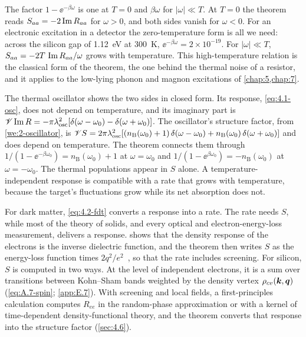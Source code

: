 The factor $1 - \ee^{-\beta\omega}$ is one at $T = 0$ and $\beta\omega$ for $|\omega| \ll T$. At $T = 0$ the theorem reads $S_{aa} = -2\operatorname{Im} R_{aa}$ for $\omega > 0$, and both sides vanish for $\omega < 0$. For an electronic excitation in a detector the zero-temperature form is all we need: across the silicon gap of \SI{1.12}{eV} at \SI{300}{K}, $\ee^{-\beta\omega} = 2\times10^{-19}$. For $|\omega| \ll T$, $S_{aa} = -2T\,\operatorname{Im} R_{aa}/\omega$ grows with temperature. This high-temperature relation is the classical form of the theorem, the one behind the thermal noise of a resistor, and it applies to the low-lying phonon and magnon excitations of \cref{chap:5,chap:7}.

The thermal oscillator shows the two sides in closed form. Its response, \cref{eq:4.1-osc}, does not depend on temperature, and its imaginary part is $\mathscr{V}\operatorname{Im} R = -\pi\lambda_{\mathrm{osc}}^2[\delta(\omega - \omega_0) - \delta(\omega + \omega_0)]$. The oscillator's structure factor, from \cref{we:2-oscillator}, is $\mathscr{V} S = 2\pi\lambda_{\mathrm{osc}}^2[(n_{\mathrm{B}}(\omega_0) + 1)\,\delta(\omega - \omega_0) + n_{\mathrm{B}}(\omega_0)\,\delta(\omega + \omega_0)]$ and does depend on temperature. The theorem connects them through $1/(1 - \ee^{-\beta\omega_0}) = n_{\mathrm{B}}(\omega_0) + 1$ at $\omega = \omega_0$ and $1/(1 - \ee^{\beta\omega_0}) = -n_{\mathrm{B}}(\omega_0)$ at $\omega = -\omega_0$. The thermal populations appear in $S$ alone. A temperature-independent response is compatible with a rate that grows with temperature, because the target's fluctuations grow while its net absorption does not.

For dark matter, \cref{eq:4.2-fdt} converts a response into a rate. The rate needs $S$, while most of the theory of solids, and every optical and electron-energy-loss measurement, delivers a response.  shows that the density response of the electrons is the inverse dielectric function, and the theorem then writes $S$ as the energy-loss function times $2q^2/e^2$~\cite[Eq.~(6)]{knapen2021dark}, so that the rate includes screening. For silicon, $S$ is computed in two ways. At the level of independent electrons, it is a sum over transitions between Kohn--Sham bands weighted by the density vertex $\rho_{cv}(\bm{k},\bm{q})$ (\cref{eq:A.7-spin}; \cref{app:E.7}). With screening and local fields, a first-principles calculation computes $R_{ee}$ in the random-phase approximation or with a kernel of time-dependent density-functional theory, and the theorem converts that response into the structure factor (\cref{sec:4.6}).

